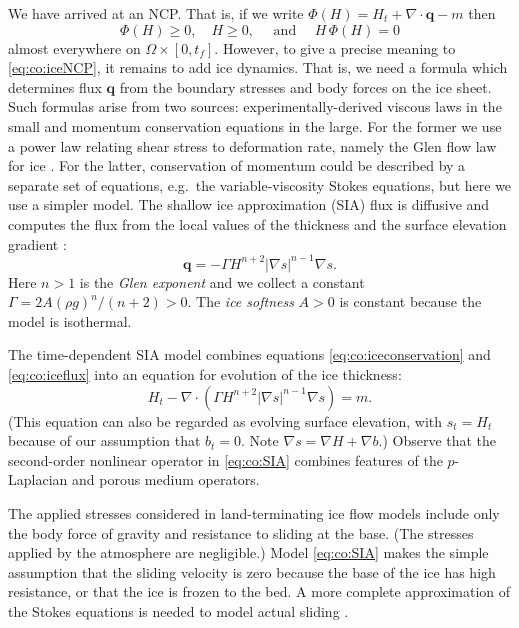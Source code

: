 \documentclass[final,leqno,onefignum,onetabnum]{siamltex1213bueler}
\newcommand{\Div}{\nabla\cdot}
\renewcommand{\grad}{\nabla}
\begin{document}
We have arrived at an NCP.  That is, if we write $\Phi(H) = H_t + \Div \mathbf{q} - m$ then
\begin{equation}
\Phi(H) \ge 0, \quad H \ge 0, \quad \text{ and } \quad H\, \Phi(H) = 0  \label{eq:co:iceNCP}
\end{equation}
almost everywhere on $\Omega \times [0,t_f]$.  However, to give a precise meaning to \eqref{eq:co:iceNCP}, it remains to add ice dynamics.  That is, we need a formula which determines flux $\mathbf{q}$ from the boundary stresses and body forces on the ice sheet.  Such formulas arise from two sources: experimentally-derived viscous laws in the small and momentum conservation equations in the large.  For the former we use a power law relating shear stress to deformation rate, namely the Glen flow law for ice \cite{GreveBlatter2009}.  For the latter, conservation of momentum could be described by a separate set of equations, e.g.~the variable-viscosity Stokes equations, but here we use a simpler model.  The shallow ice approximation (SIA) flux is diffusive and computes the flux from the local values of the thickness and the surface elevation gradient \cite{Fowler1997,GreveBlatter2009}:
\begin{equation}
\mathbf{q} = - \Gamma H^{n+2} |\grad s|^{n-1} \grad s. \label{eq:co:iceflux}
\end{equation}
Here $n > 1$ is the \emph{Glen exponent} \cite{GreveBlatter2009} and we collect a constant $\Gamma = 2 A (\rho g)^n / (n+2)>0$.  The \emph{ice softness} $A>0$ is constant because the model is isothermal.

The time-dependent SIA model combines equations \eqref{eq:co:iceconservation} and \eqref{eq:co:iceflux} into an equation for evolution of the ice thickness:
\begin{equation}
H_t - \Div\left( \Gamma H^{n+2} |\grad s|^{n-1} \grad s\right) = m.   \label{eq:co:SIA}
\end{equation}
(This equation can also be regarded as evolving surface elevation, with $s_t=H_t$ because of our assumption that $b_t=0$.  Note $\grad s = \grad H + \grad b$.)  Observe that the second-order nonlinear operator in \eqref{eq:co:SIA} combines features of the $p$-Laplacian \cite{BarrettLiu1993} and porous medium \cite{Vazquez2007} operators.

The applied stresses considered in land-terminating ice flow models include only the body force of gravity and resistance to sliding at the base.  (The stresses applied by the atmosphere are negligible.)  Model \eqref{eq:co:SIA} makes the simple assumption that the sliding velocity is zero because the base of the ice has high resistance, or that the ice is frozen to the bed.  A more complete approximation of the Stokes equations is needed to model actual sliding \cite{BuelerBrown2009}.
\end{document}
